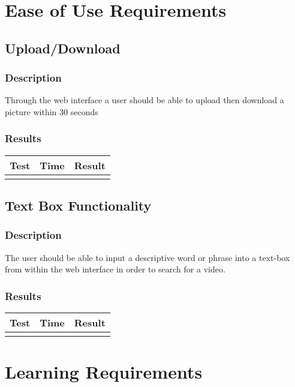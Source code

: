 \documentclass{scrreprt}
\begin{document}
\section{Ease of Use Requirements}
\subsection{Upload/Download}
\subsubsection{Description}
\begin{flushleft}
Through the web interface a user should be able to upload then download a picture within 30 seconds
\subsubsection{Results}
\end{flushleft}
 \centering
 \begin{tabular}{||p{1.5cm}|p{1.5cm}|p{1.5cm}||}
 \hline
 \bf Test & \bf Time & \bf Result \\
 \hline\hline
   &  & \\ %
 \hline
 \end{tabular}

\subsection{Text Box Functionality}
\subsubsection{Description}
\begin{flushleft}
The user should be able to input a descriptive word or phrase into a text-box from within the web interface in order to search for a video.
\subsubsection{Results}
\end{flushleft}
 \centering
 \begin{tabular}{||p{1.5cm}|p{1.5cm}|p{1.5cm}||}
 \hline
 \bf Test & \bf Time & \bf Result \\
 \hline\hline
   &  & \\ %
 \hline
 \end{tabular}

\section{Learning Requirements}
\end{document}
